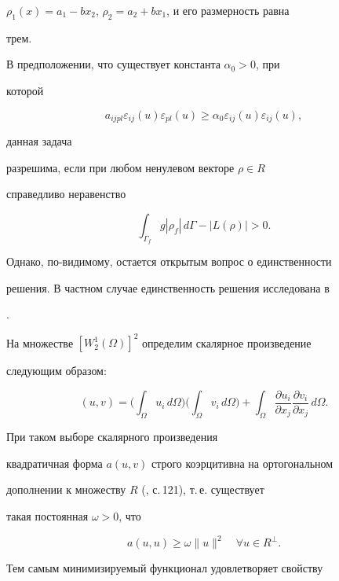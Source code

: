 \begin{examnonum}
$\rho_1(x)=a_1-bx_2$, $\rho_2=a_2+bx_1$, и его размерность равна


трем.





В предположении, что существует константа $\alpha_0>0$, при


которой


$$


a_{ijpl}\varepsilon_{ij}(u)\varepsilon_{pl}(u)\ge \alpha_0


\varepsilon_{ij}(u)\varepsilon_{ij}(u),


$$


данная задача


разрешима, если при любом ненулевом векторе $\rho\in R$


справедливо неравенство \cite{2}


$$


\int_{\Gamma_f}g|\rho_f|\,d\Gamma-|L(\rho)|>0.


$$


Однако, по-видимому, остается открытым вопрос о единственности


решения. В частном случае единственность решения исследована в


\cite{5}.





На множестве $[W_2^1(\Omega)]^2$ определим скалярное произведение


следующим образом:


$$


(u,v)=\bigg(\int_\Omega u_i\,d\Omega\bigg)


\bigg(\int_\Omega v_i\,d\Omega\bigg)+\int_\Omega


\frac {\partial u_i}{\partial x_j}\frac{\partial v_i}{\partial


x_j}\,d\Omega.


$$


При таком выборе скалярного произведения


квадратичная форма $a(u,v)$ строго коэрцитивна на ортогональном


дополнении к множеству $R$ (\cite{6}, с.\,121), т.\,е. существует


такая постоянная $\omega>0$, что


$$


a(u,u)\ge \omega\|u\|^2\quad \forall u\in R^\bot.


$$


Тем самым минимизируемый функционал удовлетворяет свойству



\end{examnonum}
